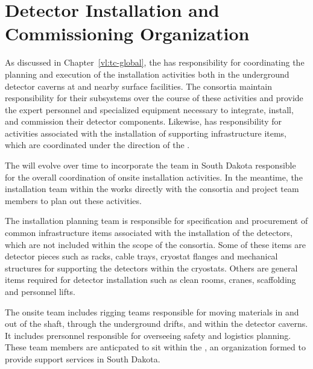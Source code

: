 \chapter{Detector Installation and Commissioning Organization}
\label{ch:tc-jpo}


As discussed in Chapter~\ref{vl:tc-global}, the  has
responsibility for coordinating the planning and execution of 
the  installation activities both 
in the underground detector caverns at  and 
nearby surface facilities.  The  consortia maintain 
responsibility for their subsystems over the course of these 
activities and provide the expert personnel and specialized 
equipment necessary to integrate, install, and commission their 
detector components.  Likewise,  has responsibility 
for activities associated with the installation 
of supporting infrastructure items, which are coordinated under 
the direction of the .       

The  will evolve over time to incorporate the team in South 
Dakota responsible for the overall coordination of onsite
installation activities.  In the meantime, the installation team 
within the  works directly with the  consortia 
and  project team members to plan out these activities.  

The  installation planning team is 
responsible for specification and procurement of common infrastructure 
items associated with the installation of the detectors, 
which are not included within the scope of the  consortia.  
Some of these items are detector pieces such as racks, cable trays, cryostat 
flanges and mechanical structures for supporting the detectors within 
the cryostats.  Others are general items required for detector
installation such as clean rooms, cranes, scaffolding and personnel 
lifts.

The onsite  team includes rigging 
teams responsible for moving materials in and out of the shaft, through the 
underground drifts, and within the detector caverns.  It includes
prersonnel responsible for overseeing safety and logistics planning.  These 
team members are anticpated to sit within the , an organization 
formed to provide  support services in South Dakota.    

